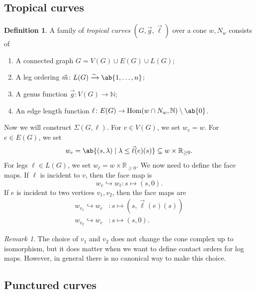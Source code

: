 \documentclass{amsart}
\theoremstyle{definition}
\newtheorem{defn}[thm]{Definition}
\theoremstyle{remark}
\newtheorem{rmk}[thm]{Remark}
\theoremstyle{plain}
\theoremstyle{definition}
\theoremstyle{remark}
\newcommand{\N}{\mathbb{N}}
\newcommand{\R}{\mathbb{R}}
\newcommand{\1}{\mathbf{1}}
\newcommand{\2}{\mathbf{2}}
\newcommand{\3}{\mathbf{3}}
\DeclareMathOperator{\Hom}{Hom}
\begin{document}
\subsection{Tropical curves}%
\label{sub:Tropical curves}

\begin{defn}
    A family of \textit{tropical curves} \((G, \vec{g}, \vec{\ell})\) over a cone \(w, N_w\) consists of
    \begin{enumerate}
        \item A connected graph \(G = V(G) \cup E(G) \cup L(G)\);
        \item A leg ordering \(\vec{m} \colon L(G) \xrightarrow{\sim} \ab\{1, \ldots, n\}\);
        \item A genus function \(\vec{g} \colon V(G) \to \N\);
        \item An edge length function \(\ell \colon E(G) \to \Hom(w \cap N_w, \N) \setminus \ab\{0\}\).
    \end{enumerate}
\end{defn}

Now we will construct \(\Sigma(G, \ell)\). For \(v \in V(G)\), we set \(w_v = w\). For \(e \in E(G)\), we set
\[ w_e = \ab\{ (s, \lambda) \mid \lambda \leq \vec{\ell}(e)(s) \} \subseteq w \times \R_{\geq 0}. \]
For legs \(\ell \in L(G)\), we set \(w_{\ell} = w \times \R_{\geq 0}\). We now need to define the face maps. If \(\ell\) is incident to \(v\), then the face map is
\[ w_v \hookrightarrow w_{\ell} \colon s \mapsto (s, 0). \]
If \(e\) is incident to two vertices \(v_1, v_2\), then the face maps are
\begin{align*}
    w_{v_1} \hookrightarrow w_e &\colon s \mapsto (s, \vec{\ell}(e)(s)) \\
    w_{v_2} \hookrightarrow w_e & \colon s \mapsto (s, 0).
\end{align*}
\begin{rmk}
    The choice of \(v_1\) and \(v_2\) does not change the cone complex up to isomorphism, but it does matter when we want to define contact orders for log maps. However, in general there is no canonical way to make this choice.
\end{rmk}

\subsection{Punctured curves}%
\label{sub:Punctured curves}
\end{document}
